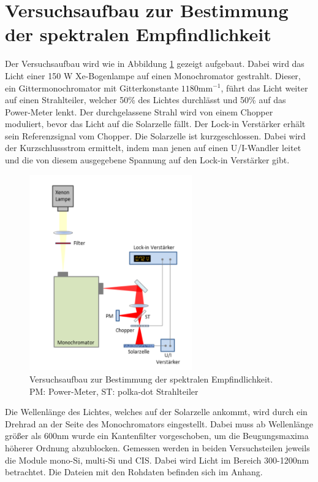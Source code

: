 
\section{Versuchsaufbau zur Bestimmung der spektralen Empfindlichkeit}



Der Versuchsaufbau wird wie in Abbildung \ref{Versuch1} gezeigt aufgebaut. Dabei wird das Licht einer 150 W Xe-Bogenlampe auf einen Monochromator gestrahlt. 
Dieser, ein Gittermonochromator mit Gitterkonstante $1180 \mathrm{mm}^{-1}$, führt das Licht weiter auf einen Strahlteiler, welcher 50\% des Lichtes 
durchlässt und 50\% auf das Power-Meter lenkt. Der durchgelassene Strahl wird von einem Chopper moduliert, bevor das Licht auf die Solarzelle 
fällt. Der Lock-in Verstärker erhält sein Referenzsignal vom Chopper. Die Solarzelle ist kurzgeschlossen. Dabei wird der Kurzschlussstrom ermittelt, indem 
man jenen auf einen U/I-Wandler leitet und die von diesem ausgegebene Spannung auf den Lock-in Verstärker gibt. 

\begin{figure}[ht]
    \captionsetup{justification=centering,margin=2cm}
    \centering
    \includegraphics[width =7cm]{Bilder/Versuchsaufbau1.png}
    \caption{Versuchsaufbau zur Bestimmung der spektralen
    Empfindlichkeit. PM: Power-Meter, ST: polka-dot Strahlteiler
    }
    \label{Versuch1}
\end{figure}

Die Wellenlänge des Lichtes, welches auf der Solarzelle ankommt, wird durch ein Drehrad an der Seite des Monochromators eingestellt. Dabei muss ab 
Wellenlänge größer als 600nm wurde ein Kantenfilter vorgeschoben, um die Beugungsmaxima höherer Ordnung abzublocken. Gemessen werden in 
beiden Versuchsteilen jeweils die Module mono-Si, multi-Si und CIS. Dabei wird 
Licht im Bereich 300-1200nm betrachtet. Die Dateien mit den Rohdaten befinden sich im Anhang.



